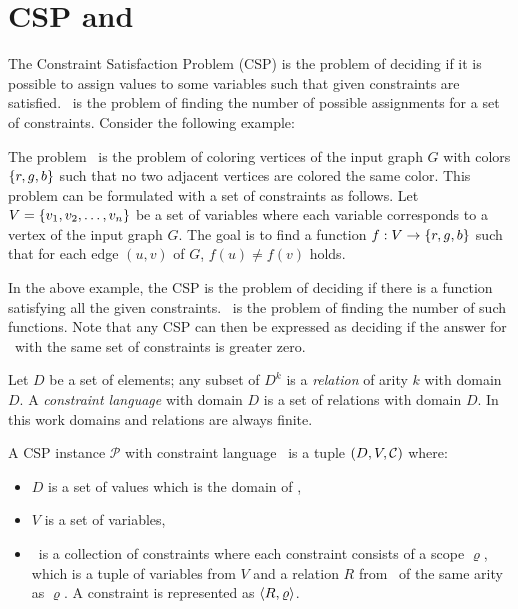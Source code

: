 \chapter{CSP and \ccsp} 
The Constraint Satisfaction Problem (CSP) is the problem of deciding if it is possible to
assign values to some variables such that given constraints are satisfied. \ccsp\ 
is the problem of finding the number of possible assignments for a set of constraints.
Consider the following example:

\begin{example}[\tcoloring]\label{exm:3col}
The problem \tcoloring\ is the problem of coloring vertices of the input graph \(G\)
with colors \(\{{r,g,b}\}\) such that no two adjacent vertices are colored the same color.
This problem can be formulated with a set of constraints as follows.
Let \(V=\{{v_1,v_2,\dotsc,v_n}\}\)
be a set of variables where each variable corresponds to a vertex of
the input graph \(G\)\@. The goal is to find a function
\(f:V\to \{{r,g,b}\}\) such that for each edge \((u,v)\) of \(G\), \(f(u)\neq f(v)\) holds.
\end{example}

In the above example,
the CSP is the problem of deciding
if there is a function satisfying all the given constraints. \ccsp\ is the
problem of finding the number of such functions. Note that any CSP can then be expressed as 
deciding if the answer for \ccsp\ with the same set of constraints is greater zero.


Let \(D\) be a set of elements; any subset of \(D^k\) is a \emph{relation} of arity \(k\) with
domain \(D\)\@. A \emph{constraint language} with domain \(D\) is a set of
relations with domain \(D\)\@.
In this work domains and relations are always finite.

A CSP instance \(\mathcal{P}\) with constraint language \mrelset\ is a tuple 
\((D,V,\mathcal{C})\) where:
\begin{itemize}
\item \(D\) is a set of values which is the domain of \mrelset,
\item \(V\) is a set of variables,
\item \mconset\ is a collection of constraints where each constraint consists of a scope \(\varrho\),
which is a tuple of variables from \(V\) and a relation \(R\) from \mrelset\
of the same arity as \(\varrho\)\@. A constraint is represented as \(\langle R, \varrho \rangle\)\@.
\end{itemize}

